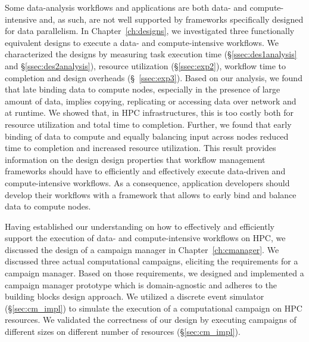 Some data-analysis workflows and applications are both data- and
compute-intensive and, as such, are not well supported by frameworks
specifically designed for data parallelism. In Chapter~\ref{ch:designs}, we
investigated three functionally equivalent designs to execute a data- and
compute-intensive workflows. We characterized the designs by measuring task
execution time (\S\ref{ssec:des1analysis} and \S\ref{ssec:des2analysis}),
resource utilization (\S\ref{ssec:exp2}), workflow time to completion and design
overheads (\S~\ref{ssec:exp3}). Based on our analysis, we found that late
binding data to compute nodes, especially in the presence of large amount of
data, implies copying, replicating or accessing data over network and at
runtime. We showed that, in HPC infrastructures, this is too costly both for
resource utilization and total time to completion. Further, we found that early
binding of data to compute and equally balancing input across nodes reduced time
to completion and increased resource utilization. This result provides
information on the design design properties that workflow management frameworks
should have to efficiently and effectively execute data-driven and
compute-intensive workflows. As a consequence, application developers should
develop their workflows with a framework that allows to early bind and balance
data to compute nodes.

Having established our understanding on how to effectively and efficiently
support the execution of data- and compute-intensive workflows on HPC, we
discussed the design of a campaign manager in Chapter~\ref{ch:cmanager}. We
discussed three actual computational campaigns, eliciting the requirements for a
campaign manager. Based on those requirements, we designed and implemented a
campaign manager prototype which is domain-agnostic and adheres to the building
blocks design approach. We utilized a discrete event simulator
(\S\ref{sec:cm_impl}) to simulate the execution of a computational campaign on
HPC resources. We validated the correctness of our design by executing campaigns
of different sizes on different number of resources (\S\ref{sec:cm_impl}).

